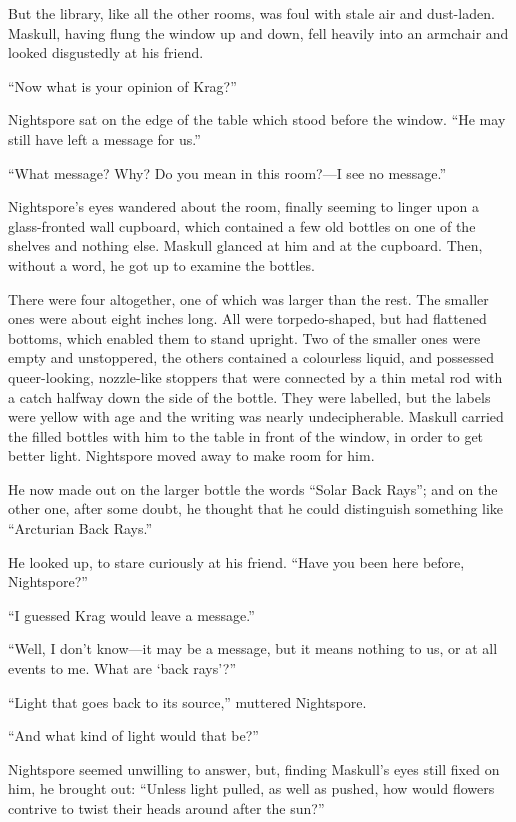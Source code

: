 But the library, like all the other rooms, was foul with stale air and dust-laden. Maskull, having flung the window up and down, fell heavily into an armchair and looked disgustedly at his friend.

``Now what is your opinion of Krag?''

Nightspore sat on the edge of the table which stood before the window. ``He may still have left a message for us.''

``What message? Why? Do you mean in this room?—I see no message.''

Nightspore's eyes wandered about the room, finally seeming to linger upon a glass-fronted wall cupboard, which contained a few old bottles on one of the shelves and nothing else. Maskull glanced at him and at the cupboard. Then, without a word, he got up to examine the bottles.

There were four altogether, one of which was larger than the rest. The smaller ones were about eight inches long. All were torpedo-shaped, but had flattened bottoms, which enabled them to stand upright. Two of the smaller ones were empty and unstoppered, the others contained a colourless liquid, and possessed queer-looking, nozzle-like stoppers that were connected by a thin metal rod with a catch halfway down the side of the bottle. They were labelled, but the labels were yellow with age and the writing was nearly undecipherable. Maskull carried the filled bottles with him to the table in front of the window, in order to get better light. Nightspore moved away to make room for him.

He now made out on the larger bottle the words ``Solar Back Rays''; and on the other one, after some doubt, he thought that he could distinguish something like ``Arcturian Back Rays.''

He looked up, to stare curiously at his friend. ``Have you been here before, Nightspore?''

``I guessed Krag would leave a message.''

``Well, I don't know—it may be a message, but it means nothing to us, or at all events to me. What are ‘back rays'?''

``Light that goes back to its source,'' muttered Nightspore.

``And what kind of light would that be?''

Nightspore seemed unwilling to answer, but, finding Maskull's eyes still fixed on him, he brought out: ``Unless light pulled, as well as pushed, how would flowers contrive to twist their heads around after the sun?''

